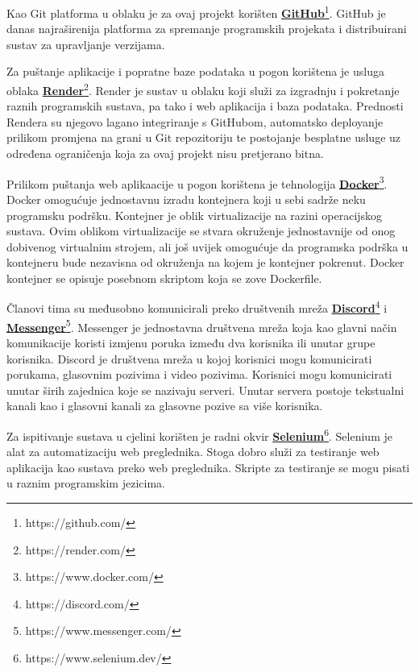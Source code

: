 			Kao Git platforma u oblaku je za ovaj projekt korišten \href{https://github.com/}{\textbf{GitHub}}\footnote{https://github.com/}. GitHub je danas najraširenija platforma za spremanje programskih projekata i distribuirani sustav za upravljanje verzijama.
			
			Za puštanje aplikacije i popratne baze podataka u pogon korištena je usluga oblaka \href{https://render.com/}{\textbf{Render}}\footnote{https://render.com/}. Render je sustav u oblaku koji služi za izgradnju i pokretanje raznih programskih sustava, pa tako i web aplikacija i baza podataka. Prednosti Rendera su njegovo lagano integriranje s GitHubom, automatsko deployanje prilikom promjena na grani u Git repozitoriju te postojanje besplatne usluge uz određena ograničenja koja za ovaj projekt nisu pretjerano bitna.
			
			Prilikom puštanja web aplikaacije u pogon korištena je tehnologija \href{https://www.docker.com/}{\textbf{Docker}}\footnote{https://www.docker.com/}. Docker omogućuje jednostavnu izradu kontejnera koji u sebi sadrže neku programsku podršku. Kontejner je oblik virtualizacije na razini operacijskog sustava. Ovim oblikom virtualizacije se stvara okruženje jednostavnije od onog dobivenog virtualnim strojem, ali još uvijek omogućuje da programska podrška u kontejneru bude nezavisna od okruženja na kojem je kontejner pokrenut. Docker kontejner se opisuje posebnom skriptom koja se zove Dockerfile.  
			
			Članovi tima su međusobno komunicirali preko društvenih mreža \href{https://discord.com/}{\textbf{Discord}}\footnote{https://discord.com/} i \href{https://www.messenger.com/}{\textbf{Messenger}}\footnote{https://www.messenger.com/}. Messenger je jednostavna društvena mreža koja kao glavni način komunikacije koristi izmjenu poruka između dva korisnika ili unutar grupe korisnika. Discord je društvena mreža u kojoj korisnici mogu komunicirati porukama, glasovnim pozivima i video pozivima. Korisnici mogu komunicirati unutar širih zajednica koje se nazivaju serveri. Unutar servera postoje tekstualni kanali kao i glasovni kanali za glasovne pozive sa više korisnika.
			
			Za ispitivanje sustava u cjelini korišten je radni okvir \href{https://www.selenium.dev/}{\textbf{Selenium}}\footnote{https://www.selenium.dev/}. Selenium je alat za automatizaciju web preglednika. Stoga dobro služi za testiranje web aplikacija kao sustava preko web preglednika. Skripte za testiranje se mogu pisati u raznim programskim jezicima. 
			

